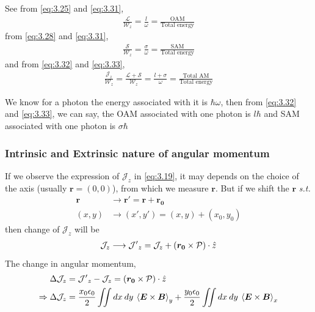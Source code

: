 \documentclass[11pt,a4paper]{article}
\numberwithin{equation}{section}
\begin{document}
See from \ref{eq:3.25} and \ref{eq:3.31}, 
\begin{align}
	\frac{\mathcal{L}}{\mathcal{W}_z} = \frac{l}{\omega} =\frac{\text{OAM}}{\text{Total energy}} \label{eq:3.32}
\end{align}
from \ref{eq:3.28} and \ref{eq:3.31},
\begin{align}
	\frac{\mathcal{S}}{\mathcal{W}_z} = \frac{\sigma}{\omega} =\frac{\text{SAM}}{\text{Total energy}}\label{eq:3.33}
\end{align}
and from \ref{eq:3.32} and \ref{eq:3.33},
\begin{align}
	\frac{\mathcal{J}_z}{\mathcal{W}_z} = \frac{\mathcal{L}+\mathcal{S}}{\mathcal{W}_z} = \frac{l+\sigma}{\omega} =\frac{\text{Total AM}}{\text{Total energy}} \label{eq:3.34}
\end{align}

We know for a photon the energy associated with it is $\hbar\omega$, then from \ref{eq:3.32} and \ref{eq:3.33}, we can say, the OAM associated with one photon is $l\hbar$ and SAM associated with one photon is $\sigma\hbar$

\subsubsection{Intrinsic and Extrinsic nature of angular momentum}
If we observe the expression of $\mathcal{J}_z$ in \ref{eq:3.19}, it may depends on the choice of the axis (usually $\boldsymbol{r} = (0,0) $), from which we measure $\boldsymbol{r}$.\cite{WO}\cite{berry 98} But if we shift the $\boldsymbol{r}$ \textit{s.t.}
\begin{align}
	\boldsymbol{r}&\longrightarrow\boldsymbol{r'}=\boldsymbol{r}+\boldsymbol{r_0}\\
	(x,y)&\longrightarrow(x',y')=(x,y)+(x_0,y_0)
\end{align}
then change of $\mathcal{J}_z$ will be
\begin{align}
	\mathcal{J}_z\longrightarrow\mathcal{J'}_z = \mathcal{J}_z +  (\boldsymbol{r_0}\times\mathcal{P})\cdot\Hat{z}
\end{align}
The change in angular momentum,
\begin{align}
	\Delta\mathcal{J}_z&= \mathcal{J'}_z-\mathcal{J}_z = (\boldsymbol{r_0}\times\mathcal{P})\cdot\Hat{z}\\
	\Rightarrow\Delta\mathcal{J}_z&= \frac{x_0\epsilon_0}{2}\iint  dx\:dy\: \expval{\boldsymbol{E}\times\boldsymbol{B}}_y + \frac{y_0\epsilon_0}{2}\iint  dx\:dy\: \expval{\boldsymbol{E}\times\boldsymbol{B}}_x \label{}
\end{align}
\end{document}

